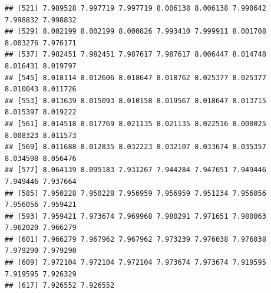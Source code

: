 \documentclass[
]{article}
\newenvironment{Shaded}{\begin{snugshade}}{\end{snugshade}}
\newcommand{\CommentTok}[1]{\textcolor[rgb]{0.56,0.35,0.01}{\textit{#1}}}
\newcommand{\FunctionTok}[1]{\textcolor[rgb]{0.00,0.00,0.00}{#1}}
\newcommand{\NormalTok}[1]{#1}
\newcommand{\OtherTok}[1]{\textcolor[rgb]{0.56,0.35,0.01}{#1}}
\newcommand{\SpecialCharTok}[1]{\textcolor[rgb]{0.00,0.00,0.00}{#1}}
\begin{document}
\begin{verbatim}
## [521] 7.989528 7.997719 7.997719 8.006138 8.006138 7.990642 7.998832 7.998832
## [529] 8.002199 8.002199 8.000826 7.993410 7.999911 8.001708 8.003276 7.976171
## [537] 7.982451 7.982451 7.987617 7.987617 8.006447 8.014748 8.016431 8.019797
## [545] 8.018114 8.012606 8.018647 8.018762 8.025377 8.025377 8.010043 8.011726
## [553] 8.013639 8.015093 8.010158 8.019567 8.018647 8.013715 8.015397 8.019222
## [561] 8.014518 8.017769 8.021135 8.021135 8.022516 8.000025 8.008323 8.011573
## [569] 8.011688 8.012835 8.032223 8.032107 8.033674 8.035357 8.034598 8.056476
## [577] 8.064139 8.095183 7.931267 7.944284 7.947651 7.949446 7.949446 7.937664
## [585] 7.950228 7.950228 7.956959 7.956959 7.951234 7.956056 7.956056 7.959421
## [593] 7.959421 7.973674 7.969968 7.980291 7.971651 7.980063 7.962020 7.966279
## [601] 7.966279 7.967962 7.967962 7.973239 7.976038 7.976038 7.979290 7.979290
## [609] 7.972104 7.972104 7.972104 7.973674 7.973674 7.919595 7.919595 7.926329
## [617] 7.926552 7.926552
\end{verbatim}

\begin{Shaded}
\end{Shaded}
\end{document}

